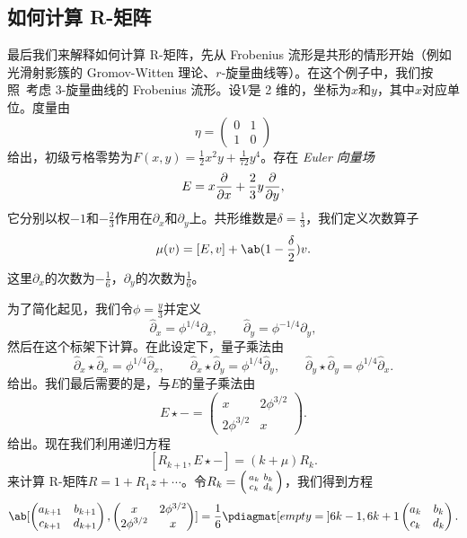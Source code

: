 \documentclass{amsart}
\theoremstyle{definition}
\theoremstyle{remark}
\theoremstyle{plain}
\theoremstyle{definition}
\theoremstyle{remark}
\newcommand{\1}{\mathbf{1}}
\newcommand{\2}{\mathbf{2}}
\newcommand{\3}{\mathbf{3}}
\begin{document}
\subsection{如何计算 R-矩阵}%
\label{sub:How to compute the R-matrix}

最后我们来解释如何计算 R-矩阵，先从 Frobenius 流形是共形的情形开始（例如光滑射影簇的 Gromov-Witten 理论、\(r\)-旋量曲线等）。在这个例子中，我们按照~\cite{PPZ2015}考虑 3-旋量曲线的 Frobenius 流形。设\(V\)是 2 维的，坐标为\(x\)和\(y\)，其中\(x\)对应单位。度量由
\[ \eta = \begin{pmatrix}
    0 & 1 \\
    1 & 0
\end{pmatrix} \]
给出，初级亏格零势为\(F(x,y) = \frac{1}{2} x^2 y + \frac{1}{72} y^4\)。存在 \textit{Euler 向量场}
\[ E = x \pdv{}{x} + \frac{2}{3} y \pdv{}{y}, \]
它分别以权\(-1\)和\(-\frac{2}{3}\)作用在\(\partial_x\)和\(\partial_y\)上。共形维数是\(\delta = \frac{1}{3}\)，我们定义次数算子
\[ \mu(v) = [E,v] + \ab(1 - \frac{\delta}{2})v. \]
这里\(\partial_x\)的次数为\(-\frac{1}{6}\)，\(\partial_y\)的次数为\(\frac{1}{6}\)。

为了简化起见，我们令\(\phi = \frac{y}{3}\)并定义
\[ \hat{\partial}_x = \phi^{1/4} \partial_x, \qquad \hat{\partial}_y = \phi^{-1/4} \partial_y, \]
然后在这个标架下计算。在此设定下，量子乘法由
\[ \hat{\partial}_x \star \hat{\partial}_x = \phi^{1/4} \hat{\partial}_x, \qquad \hat{\partial}_x \star \hat{\partial}_y = \phi^{1/4} \hat{\partial}_y, \qquad \hat{\partial}_y \star \hat{\partial}_y = \phi^{1/4} \hat{\partial}_x. \]
给出。我们最后需要的是，与\(E\)的量子乘法由
\[ E \star - = \begin{pmatrix}
    x & 2 \phi^{3/2} \\
    2 \phi^{3/2} & x
\end{pmatrix}. \]
给出。现在我们利用递归方程
\[ [R_{k+1}, E \star -] = (k + \mu) R_k. \]
来计算 R-矩阵\(R = 1 + R_1 z + \cdots\)。令\(R_k = \begin{psmallmatrix}
    a_k & b_k \\
    c_k & d_k
\end{psmallmatrix}\)，我们得到方程
\[ \ab[
    \begin{pmatrix}
        a_{k+1} & b_{k+1} \\
        c_{k+1} & d_{k+1}
    \end{pmatrix}, \begin{pmatrix}
        x & 2 \phi^{3/2} \\
        2 \phi^{3/2} & x
    \end{pmatrix}
] = \frac{1}{6} \pdiagmat[empty={}]{6k-1, 6k+1} \begin{pmatrix}
    a_k & b_k \\
    c_k & d_k
\end{pmatrix}. \]
\end{document}
